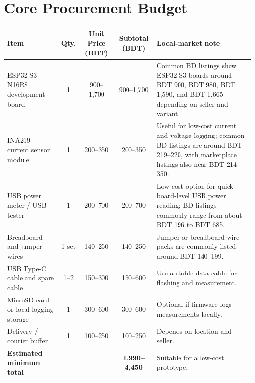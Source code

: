 \documentclass[11pt]{article}
\begin{document}
\section*{Core Procurement Budget}
\begin{tabular}{p{4.2cm}cccp{4.8cm}}
\toprule
Item & Qty. & Unit Price (BDT) & Subtotal (BDT) & Local-market note \\
\midrule
ESP32-S3 N16R8 development board & 1 & 900--1,700 & 900--1,700 & Common BD listings show ESP32-S3 boards around BDT 900, BDT 980, BDT 1,590, and BDT 1,665 depending on seller and variant. \\
INA219 current sensor module & 1 & 200--350 & 200--350 & Useful for low-cost current and voltage logging; common BD listings are around BDT 219--220, with marketplace listings also near BDT 214--350. \\
USB power meter / USB tester & 1 & 200--700 & 200--700 & Low-cost option for quick board-level USB power reading; BD listings commonly range from about BDT 196 to BDT 685. \\
Breadboard and jumper wires & 1 set & 140--250 & 140--250 & Jumper or breadboard wire packs are commonly listed around BDT 140--199. \\
USB Type-C cable and spare cable & 1--2 & 150--300 & 150--600 & Use a stable data cable for flashing and measurement. \\
MicroSD card or local logging storage & 1 & 300--600 & 300--600 & Optional if firmware logs measurements locally. \\
Delivery / courier buffer & 1 & 100--250 & 100--250 & Depends on location and seller. \\
\midrule
\textbf{Estimated minimum total} & & & \textbf{1,990--4,450} & Suitable for a low-cost prototype. \\
\bottomrule
\end{tabular}
\end{document}
